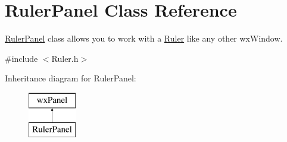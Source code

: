 \hypertarget{class_ruler_panel}{}\section{Ruler\+Panel Class Reference}
\label{class_ruler_panel}


\hyperlink{class_ruler_panel}{Ruler\+Panel} class allows you to work with a \hyperlink{class_ruler}{Ruler} like any other wx\+Window.  




{\ttfamily \#include $<$Ruler.\+h$>$}

Inheritance diagram for Ruler\+Panel\+:\begin{figure}[H]
\begin{center}
\leavevmode
\includegraphics[height=2.000000cm]{class_ruler_panel}
\end{center}
\end{figure}
